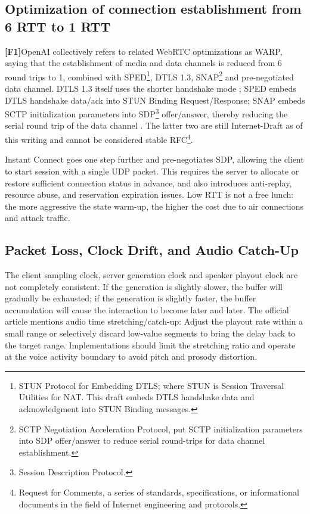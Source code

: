 \documentclass[UTF8,fontset=none,a4paper,10pt]{ctexart}
\newcommand{\FOne}{\textcolor{official}{\textbf{[F1]}}}
\begin{document}
\subsection{Optimization of connection establishment from 6 RTT to 1 RTT}

\FOne OpenAI collectively refers to related WebRTC optimizations as WARP, saying that the establishment of media and data channels is reduced from 6 round trips to 1, combined with SPED\footnote{STUN Protocol for Embedding DTLS; where STUN is Session Traversal Utilities for NAT. This draft embeds DTLS handshake data and acknowledgment into STUN Binding messages. }, DTLS 1.3, SNAP\footnote{SCTP Negotiation Acceleration Protocol, put SCTP initialization parameters into SDP offer/answer to reduce serial round-trips for data channel establishment. } and pre-negotiated data channel\cite{en:openai2026continuous}. DTLS 1.3 itself uses the shorter handshake mode \cite{en:rescorla2022dtls13}; SPED embeds DTLS handshake data/ack into STUN Binding Request/Response; SNAP embeds SCTP initialization parameters into SDP\footnote{Session Description Protocol. } offer/answer, thereby reducing the serial round trip of the data channel \cite{en:hancke2026sped,en:hancke2026snap}. The latter two are still Internet-Draft as of this writing and cannot be considered stable RFC\footnote{Request for Comments, a series of standards, specifications, or informational documents in the field of Internet engineering and protocols. }.

Instant Connect goes one step further and pre-negotiates SDP, allowing the client to start session \cite{en:openai2026continuous} with a single UDP packet. This requires the server to allocate or restore sufficient connection status in advance, and also introduces anti-replay, resource abuse, and reservation expiration issues. Low RTT is not a free lunch: the more aggressive the state warm-up, the higher the cost due to air connections and attack traffic.

\subsection{Packet Loss, Clock Drift, and Audio Catch-Up}

The client sampling clock, server generation clock and speaker playout clock are not completely consistent. If the generation is slightly slower, the buffer will gradually be exhausted; if the generation is slightly faster, the buffer accumulation will cause the interaction to become later and later. The official article mentions audio time stretching/catch-up\cite{en:openai2026continuous}: Adjust the playout rate within a small range or selectively discard low-value segments to bring the delay back to the target range. Implementations should limit the stretching ratio and operate at the voice activity boundary to avoid pitch and prosody distortion.
\end{document}
